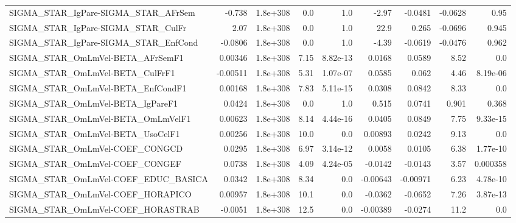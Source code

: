 \begin{tabular}{lrrrrrrrr}
SIGMA\_STAR\_IgPare-SIGMA\_STAR\_AFrSem   &      -0.738 &     1.8e+308 &      0.0 &      1.0 &      -2.97 &     -0.0481 &      -0.0628 &          0.95 \\
SIGMA\_STAR\_IgPare-SIGMA\_STAR\_CulFr    &        2.07 &     1.8e+308 &      0.0 &      1.0 &       22.9 &       0.265 &      -0.0696 &         0.945 \\
SIGMA\_STAR\_IgPare-SIGMA\_STAR\_EnfCond  &     -0.0806 &     1.8e+308 &      0.0 &      1.0 &      -4.39 &     -0.0619 &      -0.0476 &         0.962 \\
SIGMA\_STAR\_OmLmVel-BETA\_AFrSemF1      &     0.00346 &     1.8e+308 &     7.15 & 8.82e-13 &     0.0168 &      0.0589 &         8.52 &           0.0 \\
SIGMA\_STAR\_OmLmVel-BETA\_CulFrF1       &    -0.00511 &     1.8e+308 &     5.31 & 1.07e-07 &     0.0585 &       0.062 &         4.46 &      8.19e-06 \\
SIGMA\_STAR\_OmLmVel-BETA\_EnfCondF1     &     0.00168 &     1.8e+308 &     7.83 & 5.11e-15 &     0.0308 &      0.0842 &         8.33 &           0.0 \\
SIGMA\_STAR\_OmLmVel-BETA\_IgPareF1      &      0.0424 &     1.8e+308 &      0.0 &      1.0 &      0.515 &      0.0741 &        0.901 &         0.368 \\
SIGMA\_STAR\_OmLmVel-BETA\_OmLmVelF1     &     0.00623 &     1.8e+308 &     8.14 & 4.44e-16 &     0.0405 &      0.0849 &         7.75 &      9.33e-15 \\
SIGMA\_STAR\_OmLmVel-BETA\_UsoCelF1      &     0.00256 &     1.8e+308 &     10.0 &      0.0 &    0.00893 &      0.0242 &         9.13 &           0.0 \\
SIGMA\_STAR\_OmLmVel-COEF\_CONGCD        &      0.0295 &     1.8e+308 &     6.97 & 3.14e-12 &     0.0058 &      0.0105 &         6.38 &      1.77e-10 \\
SIGMA\_STAR\_OmLmVel-COEF\_CONGEF        &      0.0738 &     1.8e+308 &     4.09 & 4.24e-05 &    -0.0142 &     -0.0143 &         3.57 &      0.000358 \\
SIGMA\_STAR\_OmLmVel-COEF\_EDUC\_BASICA   &      0.0342 &     1.8e+308 &     8.34 &      0.0 &   -0.00643 &    -0.00971 &         6.23 &      4.78e-10 \\
SIGMA\_STAR\_OmLmVel-COEF\_HORAPICO      &     0.00957 &     1.8e+308 &     10.1 &      0.0 &    -0.0362 &     -0.0652 &         7.26 &      3.87e-13 \\
SIGMA\_STAR\_OmLmVel-COEF\_HORASTRAB     &     -0.0051 &     1.8e+308 &     12.5 &      0.0 &   -0.00389 &     -0.0274 &         11.2 &           0.0 \\

\end{tabular}
